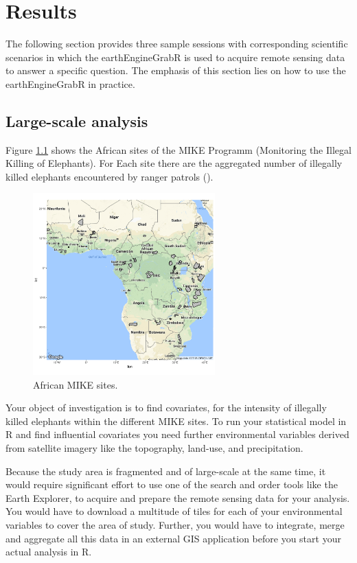 \chapter{Results}

The following section provides three sample sessions with corresponding scientific scenarios in which the earthEngineGrabR is used to acquire remote sensing data to answer a specific question. The emphasis of this section lies on how to use the earthEngineGrabR in practice.

\section{Large-scale analysis}

Figure \ref{territories} shows the African sites of the MIKE Programm (Monitoring the Illegal Killing of Elephants). 
For Each site there are the aggregated number of illegally killed elephants encountered by ranger patrols (\cite{burn2011global}).


\begin{figure}
	\begin{center}
		\includegraphics[width=7cm]{images/territories.pdf}
	\end{center}
	\caption{African MIKE sites.}
	\label{territories}
\end{figure}


Your object of investigation is to find covariates, for the intensity of illegally killed elephants within the different MIKE sites.
To run your statistical model in R and find influential covariates you need further environmental variables derived from satellite imagery like the topography, land-use, and precipitation. 

Because the study area is fragmented and of large-scale at the same time, it would require significant effort to use one of the search and order tools like the Earth Explorer, to acquire and prepare the remote sensing data for your analysis. You would have to download a multitude of tiles for each of your environmental variables to cover the area of study. Further, you would have to integrate, merge and aggregate all this data in an external GIS application before you start your actual analysis in R.


